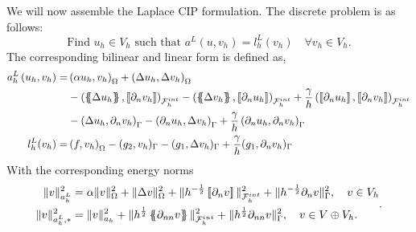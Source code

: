 We will now assemble the Laplace CIP formulation.
The discrete problem is as follows:
 \begin{equation}
    \text{Find } u_{h} \in V_{h} \text{ such that } a^{L}( u, v_{h})  = l_{h}^{L}( v_{h} )  \quad \forall v_{h} \in  V_{h}.
\end{equation}
The corresponding bilinear and linear form is defined as,
    \begin{equation}
        \label{eq:cip_laplace_form}
        \begin{split}
            a_{h}^{L} \left( u_{h}, v_{h} \right)   =&
            \left( \alpha  u_{h}, v_{h} \right) _{\Omega }   +  \left( \Delta  u_{h}, \Delta v_{h} \right) _{ \Omega } \\
                                             & - \left( \mean{  \Delta  u_{h} }, \jump{ \partial _{n }v_{h}} \right)_{\mathcal{F}_{h}^{int}  }  - \left( \mean{ \Delta  v_{h} }, \jump{ \partial _{n}u_{h} }      \right)_{\mathcal{F}_{h}^{int}  }  + \frac{\gamma }{h}
                                             \left( \jump{ \partial _{n} u_{h}}, \jump{ \partial _{n} v_{h}   }   \right)_{\mathcal{F}_{h}^{int} } \\
                                             & - \left(   \Delta  u_{h} ,  \partial _{n }v_{h} \right)_{\Gamma   }  - \left(  \partial _{n}u_{h},  \Delta  v_{h} \right)_{\Gamma  }  + \frac{\gamma }{h}  \left(  \partial _{n} u_{h},  \partial _{n} v_{h}      \right)_{ \Gamma } \\
                                             l^{L}_{h}( v_{h})  =&  \left( f, v_{h} \right) _{\Omega } - ( g_{2},  v_{h} )_{\Gamma } -  ( g_{1}, \Delta  v_{h}  )_{\Gamma }  + \frac{\gamma }{h} ( g_{1}, \partial _{n} v_{h}  )_{\Gamma }
                                         \end{split}
                                     \end{equation}
                                     With the corresponding energy norms
                                     \begin{equation}
                                         \label{eq:a_cip_energy_norm_lap}
                                         \begin{split}
                                             \| v \|_{ a_{h}^{L} }^{ 2 }& = \alpha \| v\|_{ \Omega  }^{2  }  +  \| \Delta   v \|_{ \Omega   }^{ 2 }  + \|  h^{-\frac{1}{2}} \left[\!\left[  \partial _{n} v     \right]\!\right]\|_{  \mathcal{F} _{h}^{int} }^{2  } +  \|  h^{-\frac{1}{2}}
                                             \partial _{n} v  \|_{  \Gamma  }^{2  },  \quad v \in V_{h}  \\
                                             \| v \|_{ a_{h}^{L},* }^{ 2 } &= \| v \|_{ a_{h} }^{ 2 }  + \| h^{\frac{1}{2}}  \left\{\!\!\left\{     \partial _{nn } v\right\}\!\!\right\}  \|_{ \mathcal{F}_{h}^{int}   }^{  2}+ \| h^{\frac{1}{2}}       \partial _{nn } v  \|_{ \Gamma    }^{  2}, \quad  v\in V \oplus V_{h}.
                                         \end{split}
                                         .
                                     \end{equation}



